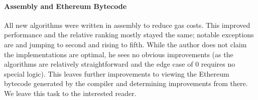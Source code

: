 \paragraph{Assembly and Ethereum Bytecode}
All new algorithms were written in assembly to reduce gas costs.
This improved performance and
the relative ranking mostly stayed the same;
notable exceptions are \UnrolledOne{} and \UnrolledTwo{} jumping to second
and \LookupFour{} rising to fifth.
While the author does not claim the implementations are optimal,
he sees no obvious improvements
(as the algorithms are relatively straightforward
and the edge case of $0$ requires no special logic).
This leaves further improvements to viewing the Ethereum
bytecode generated by the compiler and determining improvements from there.
We leave this task to the interested reader.
